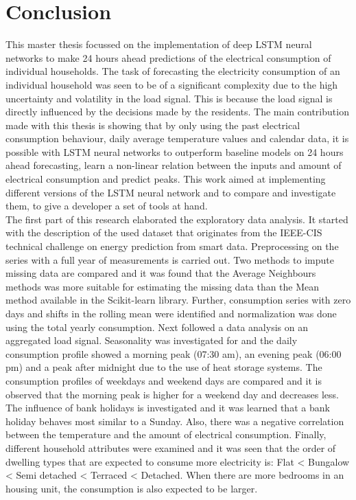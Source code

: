 \chapter{Conclusion}
\label{cha:conclusion}
This master thesis focussed on the implementation of deep LSTM neural networks to make 24 hours ahead predictions of the electrical consumption of individual households. The task of forecasting the electricity consumption of an individual household was seen to be of a significant complexity due to the high uncertainty and volatility in the load signal. This is because the load signal is directly influenced by the decisions made by the residents. The main contribution made with this thesis is showing that by only using the past electrical consumption behaviour, daily average temperature values and calendar data, it is possible with LSTM neural networks to outperform baseline models on 24 hours ahead forecasting, learn a non-linear relation between the inputs and amount of electrical consumption and predict peaks. This work aimed at implementing different versions of the LSTM neural network and to compare and investigate them, to give a developer a set of tools at hand.\\

The first part of this research elaborated the exploratory data analysis. It started with the description of the used dataset that originates from the IEEE-CIS technical challenge on energy prediction from smart data. Preprocessing on the series with a full year of measurements is carried out. Two methods to impute missing data are compared and it was found that the Average Neighbours methods was more suitable for estimating the missing data than the Mean method available in the Scikit-learn library. Further, consumption series with zero days and shifts in the rolling mean were identified and normalization was done using the total yearly consumption. Next followed a data analysis on an aggregated load signal. Seasonality was investigated for and the daily consumption profile showed a morning peak (07:30 am), an evening peak (06:00 pm) and a peak after midnight due to the use of heat storage systems. The consumption profiles of weekdays and weekend days are compared and it is observed that the morning peak is higher for a weekend day and decreases less. The influence of bank holidays is investigated and it was learned that a bank holiday behaves most similar to a Sunday. Also, there was a negative correlation between the temperature and the amount of electrical consumption. Finally, different household attributes were examined and it was seen that the order of dwelling types that are expected to consume more electricity is: Flat < Bungalow < Semi detached < Terraced < Detached. When there are more bedrooms in an housing unit, the consumption is also expected to be larger. \\ 

